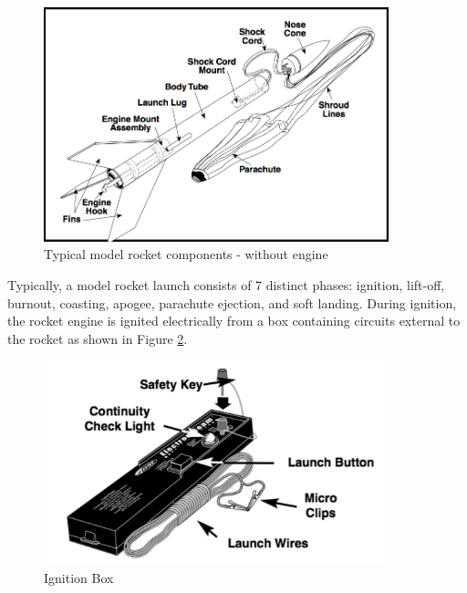 \documentclass{workreport}
\begin{document}
\begin{body}
	\begin{figure}[!ht]
		\centering
		\includegraphics[width=10cm]{./images/model_rocket_components.png}
		\caption{Typical model rocket components - without engine \cite{estes_rocket_tech}}
		\label{fig:rocket_comp}
	\end{figure}


	Typically, a model rocket launch consists of 7 distinct phases: ignition, lift-off, burnout, coasting, apogee, parachute ejection, and soft landing. During ignition, the rocket engine is ignited electrically from a box containing circuits external to the rocket as shown in Figure \ref{fig:ignition_box}.

	\begin{figure}[!ht]
		\centering
		\includegraphics[width=10cm]{./images/ignition_box.png}
		\caption{Ignition Box \cite{estes_rocket_tech}}
		\label{fig:ignition_box}
	\end{figure}


\end{body}
\end{document}

